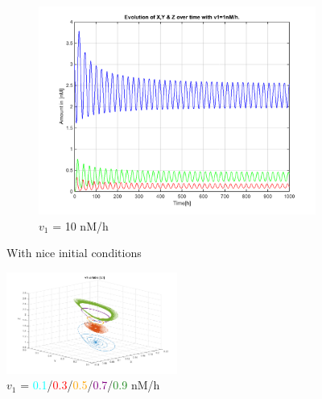 \documentclass[10pt,a4paper,oneside,twocolumn]{article}
\newcommand{\red}[1]{\textcolor{red}{#1}}
\newcommand{\cyan}[1]{\textcolor{cyan}{#1}}
\newcommand{\orange}[1]{\textcolor{orange}{#1}}
\newcommand{\purple}[1]{\textcolor{purple}{#1}}
\newcommand{\green}[1]{\textcolor{forestgreen}{#1}}
\numberwithin{equation}{section} %
\begin{document}
\begin{figure}
\begin{subfigure}[b]{0.32\textwidth}
	    \includegraphics[width=\textwidth]{LotsofthesameA/A-A10.png}
	    \caption{$v_1$ = 10 nM/h}
	\end{subfigure}

	\caption{With nice initial conditions}
    \end{figure}

    \begin{figure}
	\centering
	    \includegraphics[width=0.5\textwidth]{A2.png}
	    \caption{$v_1$ = \cyan{0.1}/\red{0.3}/\orange{0.5}/\purple{0.7}/\green{0.9} nM/h}
    \end{figure}
\end{document}
